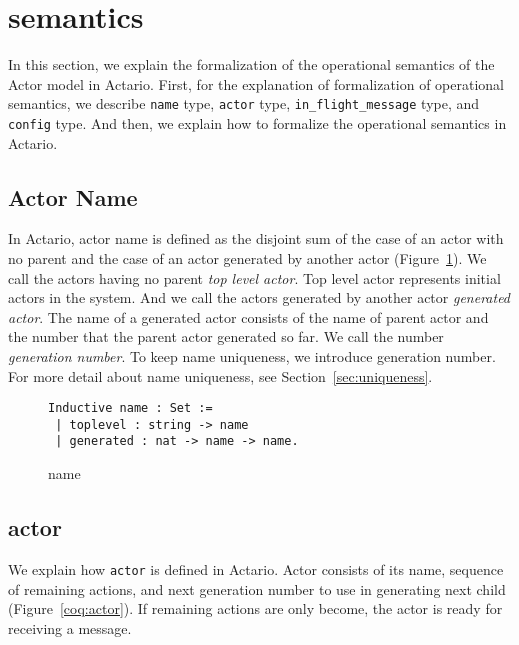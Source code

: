 \section{semantics}
\label{sec:semantics}

In this section, we explain the formalization of the operational semantics of the Actor model in Actario.
First, for the explanation of formalization of operational semantics, we describe \lstinline|name| type, \lstinline|actor| type, \lstinline|in_flight_message| type, and \lstinline|config| type.
And then, we explain how to formalize the operational semantics in Actario.

\subsection{Actor Name}
In Actario, actor name is defined as the disjoint sum of the case of an actor with no parent and the case of an actor generated by another actor (Figure~\ref{coq:name}).
We call the actors having no parent \textit{top level actor}.
Top level actor represents initial actors in the system.
And we call the actors generated by another actor \textit{generated actor}.
The name of a generated actor consists of the name of parent actor and the number that the parent actor generated so far.
We call the number \textit{generation number}.
To keep name uniqueness, we introduce generation number.
For more detail about name uniqueness, see Section~\ref{sec:uniqueness}.


\begin{figure}[t]
\begin{lstlisting}
Inductive name : Set :=
 | toplevel : string -> name
 | generated : nat -> name -> name.
\end{lstlisting}
\caption{name}\label{coq:name}
\end{figure}


\subsection{actor}
We explain how \lstinline|actor| is defined in Actario.
Actor consists of its name, sequence of remaining actions, and next generation number to use in generating next child (Figure~\ref{coq:actor}).
If remaining actions are only \textsf{become}, the actor is ready for receiving a message.

